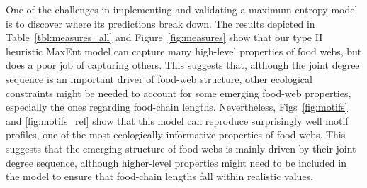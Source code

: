 
One of the challenges in implementing and validating a maximum entropy model is
to discover where its predictions break down. The results depicted in
Table~\ref{tbl:measures_all} and Figure~\ref{fig:measures} show that our type II heuristic
MaxEnt model can capture many high-level properties of food webs, but does a
poor job of capturing others. This suggests that, although the joint degree
sequence is an important driver of food-web structure, other ecological
constraints might be needed to account for some emerging food-web properties,
especially the ones regarding food-chain lengths. Nevertheless,
Figs~\ref{fig:motifs} and \ref{fig:motifs_rel} show that this model can reproduce
surprisingly well motif profiles, one of the most ecologically informative
properties of food webs. This suggests that the emerging structure of food webs
is mainly driven by their joint degree sequence, although higher-level
properties might need to be included in the model to ensure that food-chain
lengths fall within realistic values. 


